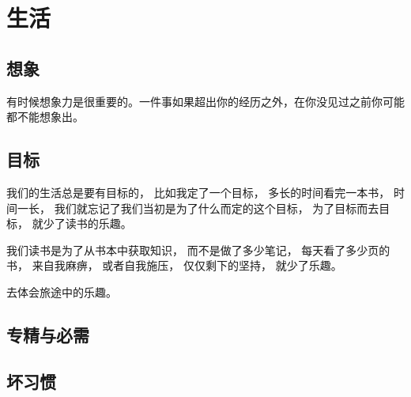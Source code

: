 
\chapter{生活}

\section{想象}

有时候想象力是很重要的。一件事如果超出你的经历之外，在你没见过之前你可能都不能想象出。

\section{目标}

我们的生活总是要有目标的，
比如我定了一个目标，
多长的时间看完一本书，
时间一长，
我们就忘记了我们当初是为了什么而定的这个目标，
为了目标而去目标，
就少了读书的乐趣。



我们读书是为了从书本中获取知识，
而不是做了多少笔记，
每天看了多少页的书，
来自我麻痹，
或者自我施压，
仅仅剩下的坚持，
就少了乐趣。


去体会旅途中的乐趣。


\section{专精与必需}

\section{坏习惯}


